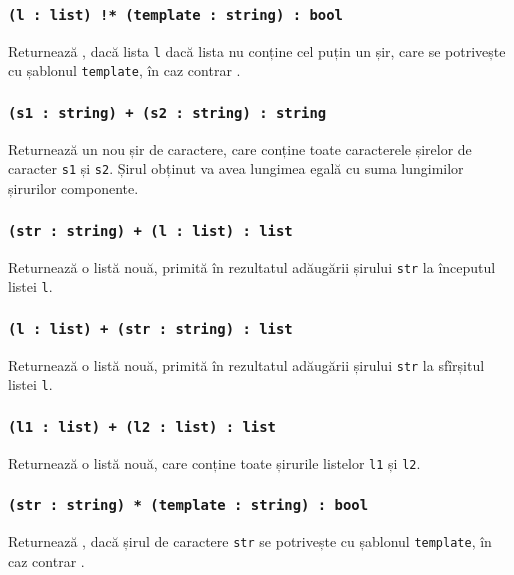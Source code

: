\subsubsection{\texttt{(l : list) !* (template : string) : bool}}

Returnează \true{}, dacă lista \texttt{l} dacă lista nu conține cel puțin un șir, care se potrivește cu șablonul \texttt{template}, în caz contrar \false{}.

\subsubsection{\texttt{(s1 : string) + (s2 : string) : string}}

Returnează un nou șir de caractere, care conține toate caracterele șirelor de caracter \texttt{s1} și \texttt{s2}. Șirul obținut va avea lungimea egală cu suma lungimilor șirurilor componente.

\subsubsection{\texttt{(str : string) + (l : list) : list}}

Returnează o listă nouă, primită în rezultatul adăugării șirului \texttt{str} la începutul listei \texttt{l}.

\subsubsection{\texttt{(l : list) + (str : string) : list}}

Returnează o listă nouă, primită în rezultatul adăugării șirului \texttt{str} la sfîrșitul listei \texttt{l}.

\subsubsection{\texttt{(l1 : list) + (l2 : list) : list}}

Returnează o listă nouă, care conține toate șirurile listelor \texttt{l1} și \texttt{l2}.

\subsubsection{\texttt{(str : string) * (template : string) : bool}}

Returnează \true{}, dacă șirul de caractere \texttt{str} se potrivește cu șablonul \texttt{template}, în caz contrar \false{}.

